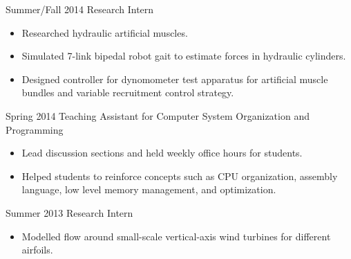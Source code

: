 \documentclass{BradyResume}
\begin{document}
%
           {Summer/Fall 2014}%
           {Research Intern}
\begin{itemize}
  \item Researched hydraulic artificial muscles.
  \item Simulated 7-link bipedal robot gait to estimate forces in hydraulic cylinders.
  \item Designed controller for dynomometer test apparatus for artificial muscle bundles and variable recruitment control strategy.
\end{itemize}

%
		   {Spring 2014}%
		   {Teaching Assistant for Computer System %
            Organization and Programming}
\begin{itemize}
  \item Lead discussion sections and held weekly office hours for students.
  \item Helped students to reinforce concepts such as CPU organization, assembly language, low level memory management, and optimization.
\end{itemize}

%
           {Summer 2013}%
           {Research Intern}%
\begin{itemize}
  \item Modelled flow around small-scale vertical-axis wind turbines for different airfoils.
\end{itemize}


\end{document}
